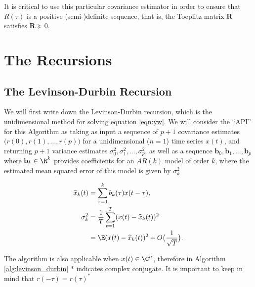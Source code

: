 \documentclass[12pt]{article}
\begin{document}
It is critical to use this particular covariance estimator in order to
ensure that $R(\tau)$ is a positive (semi-)definite sequence, that is,
the Toeplitz matrix $\mathbf{R}$ satisfies $\mathbf{R} \succeq 0$.

\section{The Recursions}

\subsection{The Levinson-Durbin Recursion}
We will first write down the Levinson-Durbin recursion, which is the
unidimensional method for solving equation \ref{eqn:yw}.  We will
consider the ``API'' for this Algorithm as taking as input a sequence
of $p + 1$ covariance estimates $\big(r(0), r(1), \ldots, r(p)\big)$ for a
unidimensional ($n = 1$) time series $x(t)$, and returning $p + 1$
variance estimates $\sigma_0^2, \sigma_1^2, \ldots, \sigma_p^2$, as
well as a sequence $\mathbf{b}_0, \mathbf{b}_1, \ldots, \mathbf{b}_p$
where $\mathbf{b}_k \in \R^{k}$ provides coefficients for an $AR(k)$
model of order $k$, where the estimated mean squared error of this
model is given by $\sigma_k^2$

\begin{equation}
  \begin{aligned}
    \widehat{x}_k(t) &= \sum_{\tau = 1}^k b_k(\tau) x(t - \tau),\\
    \sigma_k^2 &= \frac{1}{T}\sum_{t = 1}^T (x(t) - \widehat{x}_k(t))^2\\
    &= \E(x(t) - \widehat{x}_k(t))^2 + O\big(\frac{1}{\sqrt{T}}\big).
  \end{aligned}
\end{equation}

The algorithm is also applicable when $x(t) \in \C^n$, therefore in
Algorithm \ref{alg:levinson_durbin} $*$ indicates complex
conjugate.  It is important to keep in mind that
$r(-\tau) = r(\tau)^*$
\end{document}
